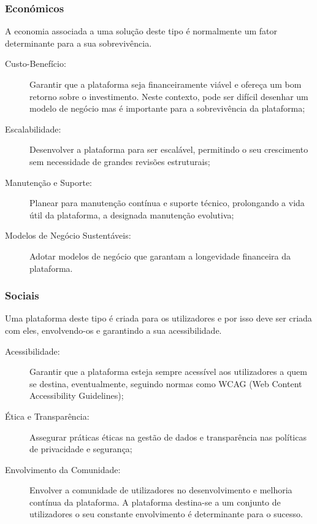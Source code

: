 \subsubsection{Económicos}

A economia associada a uma solução deste tipo é normalmente um fator determinante para a sua sobrevivência.

\begin{description}
    \item[Custo-Benefício:] Garantir que a plataforma seja financeiramente viável e ofereça um bom retorno sobre o investimento.
    Neste contexto, pode ser difícil desenhar um modelo de negócio mas é importante para a sobrevivência da plataforma;
    \item[Escalabilidade:] Desenvolver a plataforma para ser escalável, permitindo o seu crescimento sem necessidade de grandes 
    revisões estruturais;
    \item[Manutenção e Suporte:] Planear para manutenção contínua e suporte técnico, prolongando a vida útil da plataforma, a 
    designada manutenção evolutiva;
    \item[Modelos de Negócio Sustentáveis:] Adotar modelos de negócio que garantam a longevidade financeira da plataforma.
\end{description}    

\subsubsection{Sociais}

Uma plataforma deste tipo é criada para os utilizadores e por isso deve ser criada com eles, envolvendo-os e garantindo a sua
acessibilidade. 

\begin{description}
    \item[Acessibilidade:] Garantir que a plataforma esteja sempre acessível aos 
    utilizadores a quem se destina, eventualmente, seguindo normas como WCAG (Web Content Accessibility Guidelines);
    \item[Ética e Transparência:] Assegurar práticas éticas na gestão de dados e transparência nas políticas de privacidade 
    e segurança;
    \item[Envolvimento da Comunidade:] Envolver a comunidade de utilizadores no desenvolvimento e melhoria contínua da plataforma. 
    A plataforma destina-se a um conjunto de utilizadores o seu constante envolvimento é determinante para o sucesso.
\end{description}

